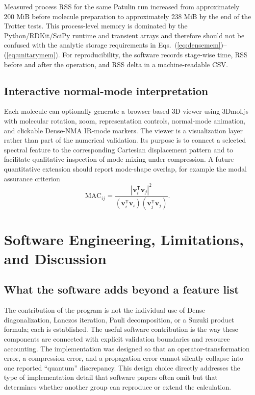 \documentclass[aip,jcp,reprint,amsmath,amssymb,floatfix]{revtex4-2}
\begin{document}
Measured process RSS for the same Patulin run increased from approximately 200 MiB before molecule preparation to approximately 238 MiB by the end of the Trotter tests. This process-level memory is dominated by the Python/RDKit/SciPy runtime and transient arrays and therefore should not be confused with the analytic storage requirements in Eqs.~(\ref{eq:densemem})--(\ref{eq:unitarymem}). For reproducibility, the software records stage-wise time, RSS before and after the operation, and RSS delta in a machine-readable CSV.

\subsection{Interactive normal-mode interpretation}
Each molecule can optionally generate a browser-based 3D viewer using 3Dmol.js\cite{Rego2015} with molecular rotation, zoom, representation controls, normal-mode animation, and clickable Dense-NMA IR-mode markers. The viewer is a visualization layer rather than part of the numerical validation. Its purpose is to connect a selected spectral feature to the corresponding Cartesian displacement pattern and to facilitate qualitative inspection of mode mixing under compression. A future quantitative extension should report mode-shape overlap, for example the modal assurance criterion
\begin{equation}
\mathrm{MAC}_{ij}=\frac{|\mathbf{v}_i^{\mathsf T}\mathbf{v}_j|^2}
{(\mathbf{v}_i^{\mathsf T}\mathbf{v}_i)(\mathbf{v}_j^{\mathsf T}\mathbf{v}_j)}.
\end{equation}

\section{Software Engineering, Limitations, and Discussion}
\subsection{What the software adds beyond a feature list}
The contribution of the program is not the individual use of Dense diagonalization, Lanczos iteration, Pauli decomposition, or a Suzuki product formula; each is established. The useful software contribution is the way these components are connected with explicit validation boundaries and resource accounting. The implementation was designed so that an operator-transformation error, a compression error, and a propagation error cannot silently collapse into one reported ``quantum'' discrepancy. This design choice directly addresses the type of implementation detail that software papers often omit but that determines whether another group can reproduce or extend the calculation.
\end{document}
